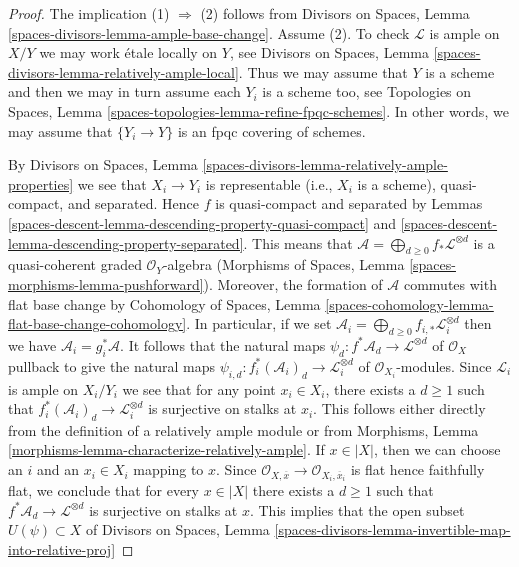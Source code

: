 \begin{proof}
The implication (1) $\Rightarrow$ (2) follows from
Divisors on Spaces, Lemma \ref{spaces-divisors-lemma-ample-base-change}.
Assume (2). To check $\mathcal{L}$ is ample on $X/Y$ we may
work \'etale locally on $Y$, see
Divisors on Spaces, Lemma \ref{spaces-divisors-lemma-relatively-ample-local}.
Thus we may assume that $Y$ is a scheme and then we may
in turn assume each $Y_i$ is a scheme too, see
Topologies on Spaces, Lemma \ref{spaces-topologies-lemma-refine-fpqc-schemes}.
In other words, we may assume that
$\{Y_i \to Y\}$ is an fpqc covering of schemes.

\medskip\noindent
By Divisors on Spaces, Lemma
\ref{spaces-divisors-lemma-relatively-ample-properties}
we see that $X_i \to Y_i$ is representable (i.e., $X_i$ is a scheme),
quasi-compact, and separated. Hence $f$ is quasi-compact and separated by
Lemmas \ref{spaces-descent-lemma-descending-property-quasi-compact} and
\ref{spaces-descent-lemma-descending-property-separated}.
This means that
$\mathcal{A} = \bigoplus_{d \geq 0} f_*\mathcal{L}^{\otimes d}$
is a quasi-coherent graded $\mathcal{O}_Y$-algebra
(Morphisms of Spaces, Lemma \ref{spaces-morphisms-lemma-pushforward}).
Moreover, the formation of $\mathcal{A}$ commutes with flat
base change by
Cohomology of Spaces, Lemma
\ref{spaces-cohomology-lemma-flat-base-change-cohomology}.
In particular, if we set
$\mathcal{A}_i = \bigoplus_{d \geq 0} f_{i, *}\mathcal{L}_i^{\otimes d}$
then we have $\mathcal{A}_i = g_i^*\mathcal{A}$.
It follows that the natural maps
$\psi_d : f^*\mathcal{A}_d \to \mathcal{L}^{\otimes d}$
of $\mathcal{O}_X$
pullback to give the natural maps
$\psi_{i, d} : f_i^*(\mathcal{A}_i)_d \to \mathcal{L}_i^{\otimes d}$
of $\mathcal{O}_{X_i}$-modules. Since $\mathcal{L}_i$ is ample on $X_i/Y_i$
we see that for any point $x_i \in X_i$, there exists a $d \geq 1$
such that $f_i^*(\mathcal{A}_i)_d \to \mathcal{L}_i^{\otimes d}$
is surjective on stalks at $x_i$. This follows either directly
from the definition of a relatively ample module or from
Morphisms, Lemma \ref{morphisms-lemma-characterize-relatively-ample}.
If $x \in |X|$, then we can choose an $i$ and an $x_i \in X_i$
mapping to $x$. Since
$\mathcal{O}_{X, \overline{x}} \to \mathcal{O}_{X_i, \overline{x}_i}$
is flat hence faithfully flat, we conclude that for every $x \in |X|$
there exists a $d \geq 1$ such that
$f^*\mathcal{A}_d \to \mathcal{L}^{\otimes d}$
is surjective on stalks at $x$.
This implies that the open subset $U(\psi) \subset X$ of
Divisors on Spaces, Lemma
\ref{spaces-divisors-lemma-invertible-map-into-relative-proj}

\end{proof}
